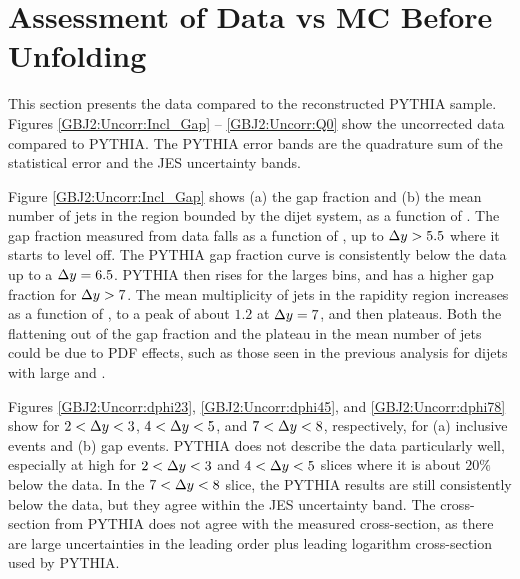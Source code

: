 \section{Assessment of Data vs MC Before Unfolding}
\label{sec:GBJ2:Uncorr}
This section presents the data compared to the reconstructed PYTHIA sample.
Figures \ref{GBJ2:Uncorr:Incl_Gap} -- \ref{GBJ2:Uncorr:Q0} show the uncorrected data compared to PYTHIA.
The PYTHIA error bands are the quadrature sum of the statistical error and the JES uncertainty bands. 

Figure \ref{GBJ2:Uncorr:Incl_Gap} shows (a) the gap fraction and (b) the mean number of jets in the region bounded by the dijet system, as a function of \dy{}.
The gap fraction measured from data falls as a function of \dy{}, up to $\mbox{$\Delta y$}{}>5.5$ where it starts to level off.
The PYTHIA gap fraction curve is consistently below the data up to a $\mbox{$\Delta y$}{}=6.5$.
PYTHIA then rises for the larges \dy{} bins, and has a higher gap fraction for $\mbox{$\Delta y$}{}>7$. 
The mean multiplicity of jets in the rapidity region increases as a function of \dy{}, to a peak of about $1.2$ at $\mbox{$\Delta y$}{}=7$, and then plateaus.
Both the flattening out of the gap fraction and the plateau in the mean number of jets could be due to PDF effects, such as those seen in the previous analysis for dijets with large \dy{} and \ptb{}.


Figures \ref{GBJ2:Uncorr:dphi23}, \ref{GBJ2:Uncorr:dphi45}, and \ref{GBJ2:Uncorr:dphi78} show \dphidyDist{} for $2<\mbox{$\Delta y$}{}<3$, $4<\mbox{$\Delta y$}{}<5$, and $7<\mbox{$\Delta y$}{}<8$,  respectively, for (a) inclusive events and (b) gap events.
PYTHIA does not describe the data particularly well, especially at high \dphi{} for  $2<\mbox{$\Delta y$}{}<3$ and $4<\mbox{$\Delta y$}{}<5$ slices where it is about $20\%$ below the data.
In the  $7<\mbox{$\Delta y$}{}<8$ slice, the PYTHIA results are still consistently below the data, but they agree within the JES uncertainty band.
The cross-section from PYTHIA does not agree with the measured cross-section, as there are large uncertainties in the leading order plus leading logarithm cross-section used by PYTHIA.

